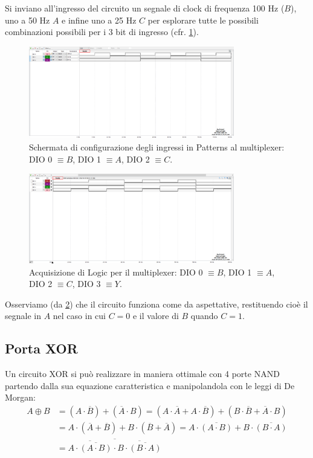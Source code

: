 \documentclass[10pt, a4paper, italian]{article}
\begin{document}
Si inviano all'ingresso del circuito un segnale di clock di frequenza 100 Hz
($B$), uno a 50 Hz $A$ e infine uno a 25 Hz $C$ per esplorare tutte le
possibili combinazioni possibili per i 3 bit di ingresso
(cfr. \cref{fig: mult_pat}).
\begin{figure}[htbp]
    \centering
    \includegraphics[width=0.8\textwidth]{pat2.png}
    \caption{Schermata di configurazione degli ingressi in Patterns
    al multiplexer: DIO 0 $\equiv B$, DIO 1 $\equiv A$, DIO 2 $\equiv C$.
    \label{fig: mult_pat}}
\end{figure}
\begin{figure}[htbp]
    \centering
    \includegraphics[width=0.8\textwidth]{Multiplex.png}
    \caption{Acquisizione di Logic per il multiplexer: DIO 0 $\equiv B$,
    DIO 1 $\equiv A$, DIO 2 $\equiv C$, DIO 3 $\equiv Y$.}
    \label{fig: mult_log}
\end{figure}
Osserviamo (da \cref{fig: mult_log}) che il circuito funziona come da
aspettative, restituendo cioè il segnale in $A$ nel caso in cui $C = 0$ e
il valore di $B$ quando $C = 1$.

\subsection{Porta XOR}
Un circuito XOR si può realizzare in maniera ottimale con 4 porte NAND
partendo dalla sua equazione caratteristica e manipolandola con le leggi di
De Morgan:
\begin{align*}
  A \oplus B &= (A \cdot \overline{B}) + (\overline{A} \cdot B) = 
 (A \cdot \overline{A} + A \cdot \overline{B}) + (B \cdot \overline{B} +
 \overline{A} \cdot B) \\
 &= A \cdot (\overline{A} + \overline{B}) + B \cdot (\overline{B} +
 \overline{A}) = A \cdot \overline{(A \cdot B)} +
 B \cdot \overline{(B \cdot A)} \\
 &= \overline{\overline{A \cdot \overline{(A \cdot B)}} \cdot
 \overline{B \cdot \overline{(B \cdot A)}}}
\end{align*}
\end{document}
